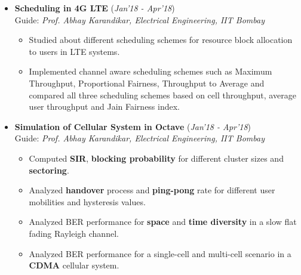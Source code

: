 \documentclass[10pt]{article}
\begin{document}

\colorbox{bl}{}
\vspace{-0.5cm}
\begin{itemize}[leftmargin=0.4cm]



\item \textbf{Scheduling in 4G LTE }
\hfill{(\textit{Jan'18 - Apr'18})}\\
Guide: \textit{Prof. Abhay Karandikar, Electrical Engineering, IIT Bombay}\\
\vspace{-0.7cm}
    \begin{itemize}
    \item Studied about different scheduling schemes for resource block allocation to users in LTE systems.\vspace{-0.1cm}
    \item Implemented channel aware scheduling schemes such as Maximum Throughput, Proportional Fairness, Throughput to Average and compared all three scheduling schemes based on cell throughput, average user throughput and Jain Fairness index.
    \end{itemize}

    \vspace{-0.25cm}


\item \textbf{Simulation of Cellular System in Octave}
\hfill{(\textit{Jan'18 - Apr'18})}\\
Guide: \textit{Prof. Abhay Karandikar, Electrical Engineering, IIT Bombay}\\\vspace{-0.7cm}
    \begin{itemize}
    \item Computed \textbf{SIR}, \textbf{blocking probability} for different cluster sizes and \textbf{sectoring}.\vspace{-0.1cm}
    \item Analyzed \textbf{handover} process and \textbf{ping-pong} rate for different user mobilities and hysteresis values.\vspace{-0.1cm}
    \item Analyzed BER performance for \textbf{space} and \textbf{time diversity} in a slow flat fading Rayleigh channel.\vspace{-0.1cm}
    \item Analyzed BER performance for a single-cell and multi-cell scenario in a \textbf{CDMA} cellular system.
    \end{itemize}


\end{itemize}
\end{document}
